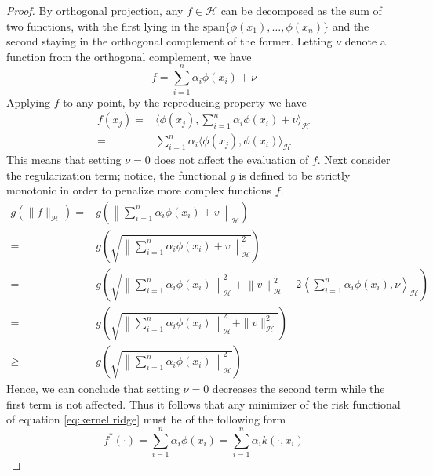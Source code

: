 \begin{proof}
    By orthogonal projection, any $f \in \mathcal{H}$ can be decomposed as the sum of two functions, with the first lying in the $\textrm{span}\{\phi(x_1),\dots, \phi(x_n)\}$ and the second staying in the orthogonal complement of the former. Letting $\nu$ denote a function from the orthogonal complement, we have
    \begin{equation}
        f=\sum\limits_{i=1}^{n}\alpha_i \phi(x_i)+\nu
    \end{equation}
    Applying $f$ to any point, by the reproducing property we have
    \begin{equation}
        \begin{aligned}
            f(x_j)=&\langle \phi(x_j), \sum\limits_{i=1}^{n}\alpha_i \phi(x_i)+\nu\rangle_{\mathcal{H}}
            \\
            =&\sum\limits_{i=1}^{n}\alpha_i\langle \phi(x_j), \phi(x_i)\rangle_{\mathcal{H}}
        \end{aligned}
    \end{equation}
    This means that setting $\nu=0$ does not affect the evaluation of $f$.
    Next consider the regularization term; notice, the functional $g$ is defined to be strictly monotonic in order to penalize more complex functions $f$.
    \begin{equation}
        \begin{aligned}
            g(\|f\|_{\mathcal{H}})=&g\left(\left\|\sum\limits_{i=1}^n \alpha_i \phi(x_i)+v\right\|_\mathcal{H}\right)
            \\
            =&g\left(\sqrt{\left\|\sum\limits_{i=1}^n \alpha_i \phi(x_i)+v\right\|_\mathcal{H}^2}\right)
            \\
            =&g\left(\sqrt{\left\|\sum\limits_{i=1}^n \alpha_i \phi(x_i)\right\|_{\mathcal{H}}^2+\left\|v\right\|_\mathcal{H}^2+2\left\langle\sum\limits_{i=1}^n \alpha_i \phi(x_i),\nu \right\rangle_{\mathcal{H}}}\right)
            \\
            =&g\left(\sqrt{\left\|\sum\limits_{i=1}^n \alpha_i \phi(x_i)\right\|_{\mathcal{H}}^2+\|v\|_\mathcal{H}^2}\right)
            \\
            \geq &g\left(\sqrt{\left\|\sum\limits_{i=1}^n \alpha_i \phi(x_i)\right\|_{\mathcal{H}}^2}\right)
        \end{aligned}
    \end{equation}
    Hence, we can conclude that setting $\nu=0$ decreases the second term while the first term is not affected. Thus it follows that any minimizer of the risk functional of equation \ref{eq:kernel ridge} must be of the following form
    \begin{equation}
        f^*(\cdot)=\sum\limits_{i=1}^n \alpha_i \phi(x_i)=\sum\limits_{i=1}^n \alpha_i k(\cdot, x_i)
    \end{equation}
\end{proof}

